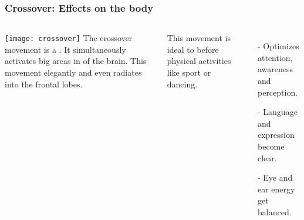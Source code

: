 \documentclass[../main.tex]{subfiles}
\begin{document}
\begin{frame}
\frametitle{Crossover: Effects on the body}

\begin{columns}[c] %
\texttt{[image: crossover]}
The crossover movement is a . It simultaneously activates big areas in  of the brain. This movement elegantly  and even radiates into the frontal lobes. 

This movement is ideal to  before physical activities like sport or dancing.
	\begin{itemize}
	\item[-] Optimizes attention, awareness and perception.
	\item[-] Language and expression become clear.
	\item[-] Eye and ear energy get balanced.
	\end{itemize}
	

\end{columns}
\end{frame}
\end{document}
